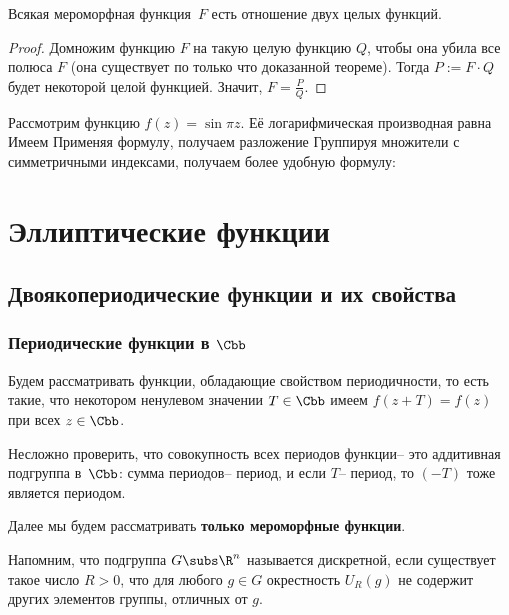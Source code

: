 \documentclass[a4paper]{article}
\begin{document}
\begin{imp}
Всякая мероморфная функция~$F$ есть отношение двух целых функций.
\end{imp}
\begin{proof}
Домножим функцию $F$ на такую целую функцию $Q$, чтобы она убила все полюса $F$
(она существует по только что доказанной теореме).
Тогда $P := F\cdot Q$ будет некоторой целой функцией. Значит, $F = \frac P Q$.
\end{proof}

\begin{ex}
Рассмотрим функцию $f(z) = \sin \pi z$. Её логарифмическая производная равна
Имеем
Применяя формулу, получаем разложение
Группируя множители с симметричными индексами, получаем более удобную формулу:
\end{ex}

\section{Эллиптические функции}

\subsection{Двоякопериодические функции и их свойства}

\subsubsection{Периодические функции в $\Cbb$}

Будем рассматривать функции, обладающие свойством периодичности, то есть такие,
что некотором ненулевом значении $T \in \Cbb$ имеем $f(z + T) = f(z)$ при всех $z \in \Cbb$.

Несложно проверить, что совокупность всех периодов функции-- это аддитивная подгруппа в~$\Cbb$:
сумма периодов-- период, и если $T$-- период, то $(-T)$ тоже является периодом.

Далее мы будем рассматривать \textbf{только мероморфные функции}.

Напомним, что подгруппа $G \subs \R^n$ называется дискретной, если существует такое число $R>0$,
что для любого $g \in G$ окрестность $U_R(g)$ не содержит других элементов группы, отличных от $g$.
\end{document}
